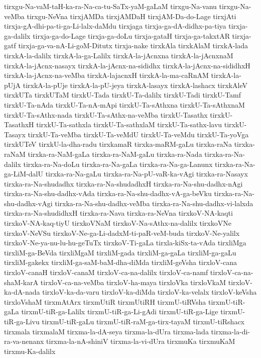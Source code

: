 {tirxgu-Na-vaM-taH-ka-ra-Na-ca-tu-SaTx-yaM-gaLaM
tirxgu-Na-vanu
tirxgu-Na-veMba
tirxgu-NeVna
tirxjAMDa
tirxjAMDaH
tirxjAM-Da-do-Lage
tirxjAti
tirxja-gA-dhi-pa-ti-ga-Li-lalx-daMdu
tirxjaga
tirxja-ga-dA-didhx-pa-tiya
tirxja-ga-dalilx
tirxja-ga-do-Lage
tirxja-ga-doLu
tirxja-gataH
tirxja-ga-takxtAR
tirxja-gatf
tirxja-ga-va-nA-Li-goM-Ditutx
tirxja-nake
tirxkAla
tirxkAlaM
tirxkA-lada
tirxkA-la-dalilx
tirxkA-la-ga-Lalilx
tirxkA-la-jAcnxna
tirxkA-la-jAcnxnaM
tirxkA-la-jAcnx-nasayx
tirxkA-la-jAcnx-na-sididhx
tirxkA-la-jAcnx-na-sididhxH
tirxkA-la-jAcnx-na-veMba
tirxkA-lajacnxH
tirxkA-la-ma-caRnAM
tirxkA-la-pUjA
tirxkA-la-pUje
tirxkA-la-pU-jeya
tirxkA-lasayx
tirxkA-lashacx
tirxkAleV
tirxkUTa
tirxkUTaM
tirxkU-Tada
tirxkU-Ta-dalilx
tirxkU-Tadi
tirxkU-Tamf
tirxkU-Ta-nAda
tirxkU-Ta-nA-mApi
tirxkU-Ta-sAthxna
tirxkU-Ta-sAthxnaM
tirxkU-Ta-sAthx-nada
tirxkU-Ta-sAthx-na-veMba
tirxkU-Tasathx
tirxkU-TasathxH
tirxkU-Ta-sathxla
tirxkU-Ta-sathxlaM
tirxkU-Ta-sathx-lavu
tirxkU-Tasayx
tirxkU-Ta-veMba
tirxkU-Ta-veMdU
tirxkU-Ta-veMdu
tirxkU-Ta-yoVga
tirxkUTeV
tirxkU-la-dha-radu
tirxkamaR
tirxka-maRM-gaLu
tirxka-raNa
tirxka-raNaM
tirxka-ra-NaM-gaLa
tirxka-ra-NaM-gaLu
tirxka-ra-Nada
tirxka-ra-Na-dalilx
tirxka-ra-Na-doLu
tirxka-ra-Na-gaLa
tirxka-ra-Na-ga-Lanunx
tirxka-ra-Na-ga-LiM-dalU
tirxka-ra-Na-gaLu
tirxka-ra-Na-pU-vaR-ka-vAgi
tirxka-ra-Nasayx
tirxka-ra-Na-shudadhx
tirxka-ra-Na-shudadhxH
tirxka-ra-Na-shu-dadhx-nAgi
tirxka-ra-Na-shu-dadhx-vAda
tirxka-ra-Na-shu-dadhx-vA-ga-beVku
tirxka-ra-Na-shu-dadhx-vAgi
tirxka-ra-Na-shu-dadhx-veMba
tirxka-ra-Na-shu-dadhx-vi-lalxda
tirxka-ra-Na-shudidhxH
tirxka-ra-Nava
tirxka-ra-NeVna
tirxkoV-NA-kaqti
tirxkoV-NA-kaq-tiyU
tirxkoVNaM
tirxkoV-Na-sAthx-na-dalilx
tirxkoVNe
tirxkoV-NeVSu
tirxkoV-Ne-ga-Li-dadxM-ti-paR-veM-buda
tirxkoV-Ne-yalilx
tirxkoV-Ne-ya-nu-lu-hu-geTuTx
tirxkoV-Ti-gaLa
tirxla-kiSx-ta-vAda
tirxliMga
tirxliM-ga-BeVda
tirxliMgaM
tirxliM-gada
tirxliM-ga-gaLa
tirxliM-ga-gaLu
tirxliM-gakekx
tirxliM-ga-saM-baM-dha-diMda
tirxliM-geVsha
tirxloV-cana
tirxloV-canaH
tirxloV-canaM
tirxloV-ca-na-dalilx
tirxloV-ca-namf
tirxloV-ca-na-shaM-karA
tirxloV-ca-na-veMba
tirxloV-ha-maya
tirxloVka
tirxloVkaM
tirxloV-ka-dA-nada
tirxloV-ka-da-varu
tirxloV-ka-diMda
tirxloV-ka-velalx
tirxloV-keVsha
tirxloVshaM
tirxmAtArx
tirxmUtiR
tirxmUtiRH
tirxmU-tiRVsha
tirxmU-tiR-gaLa
tirxmU-tiR-ga-Lalilx
tirxmU-tiR-ga-Li-gAdi
tirxmU-tiR-ga-Lige
tirxmU-tiR-ga-Livu
tirxmU-tiR-gaLu
tirxmU-tiR-raM-ga-tirx-tayaM
tirxmU-tiRshacx
tirxmala
tirxmalaM
tirxma-la-dA-seya
tirxma-la-dUra
tirxma-lada
tirxma-la-di-ra-va-nenanx
tirxma-la-nA-shiniV
tirxma-la-vi-dUra
tirxmuKa
tirxmuKaM
tirxmu-Ka-dalilx
}
